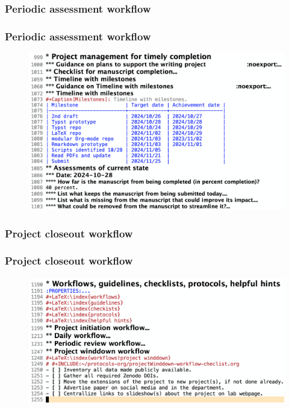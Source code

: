 \documentclass[aspectratio=169]{beamer}
\begin{document}
\subsubsection{Periodic assessment workflow}
\begin{frame}
\frametitle{Periodic assessment workflow}
\begin{figure}
    \includegraphics[scale=0.18]{Figures/periodicAssessment}
\end{figure}
\end{frame}


\subsubsection{Project closeout workflow}
\begin{frame}
\frametitle{Project closeout workflow}
\begin{figure}
    \includegraphics[scale=0.27]{Figures/projectWinddownWorkflow.png}
\end{figure}
\end{frame}
\end{document}
